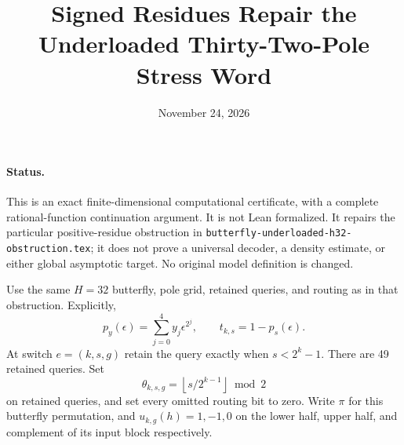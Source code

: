 \documentclass[11pt]{article}
\title{Signed Residues Repair the Underloaded Thirty-Two-Pole Stress Word}
\author{}
\date{November 24, 2026}
\begin{document}
\maketitle

\paragraph{Status.}
This is an exact finite-dimensional computational certificate, with a
complete rational-function continuation argument. It is not Lean
formalized. It repairs the particular positive-residue obstruction in
\texttt{butterfly-underloaded-h32-obstruction.tex}; it does not prove a
universal decoder, a density estimate, or either global asymptotic target.
No original model definition is changed.

Use the same $H=32$ butterfly, pole grid, retained queries, and routing
as in that obstruction. Explicitly,
\[
 p_y(\epsilon)=\sum_{j=0}^4 y_j\epsilon^{2^j},
 \qquad t_{k,s}=1-p_s(\epsilon).
\]
At switch $e=(k,s,g)$ retain the query exactly when $s<2^k-1$.
There are 49 retained queries. Set
\[
 \theta_{k,s,g}=\left\lfloor s/2^{k-1}\right\rfloor\bmod2
\]
on retained queries, and set every omitted routing bit to zero. Write
$\pi$ for this butterfly permutation, and
$u_{k,g}(h)=1,-1,0$ on the lower half, upper half, and complement
of its input block respectively.
\end{document}
